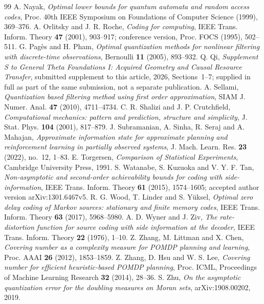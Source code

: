 \begin{thebibliography}{99}
 A. Nayak, \emph{Optimal lower bounds for quantum automata and random access codes}, Proc. 40th IEEE Symposium on Foundations of Computer Science (1999), 369--376.
 A. Orlitsky and J. R. Roche, \emph{Coding for computing}, IEEE Trans. Inform. Theory \textbf{47} (2001), 903--917; conference version, Proc. FOCS (1995), 502--511.
 G. Pag\`es and H. Pham, \emph{Optimal quantization methods for nonlinear filtering with discrete-time observations}, Bernoulli \textbf{11} (2005), 893--932.
 Q. Qi, \emph{Supplement S to General Theta Foundations I: Acquired Geometry and Causal Resource Transfer}, submitted supplement to this article, 2026, Sections~1--7; supplied in full as part of the same submission, not a separate publication.
 A. Sellami, \emph{Quantization based filtering method using first order approximation}, SIAM J. Numer. Anal. \textbf{47} (2010), 4711--4734.
 C. R. Shalizi and J. P. Crutchfield, \emph{Computational mechanics: pattern and prediction, structure and simplicity}, J. Stat. Phys. \textbf{104} (2001), 817--879.
 J. Subramanian, A. Sinha, R. Seraj and A. Mahajan, \emph{Approximate information state for approximate planning and reinforcement learning in partially observed systems}, J. Mach. Learn. Res. \textbf{23} (2022), no.~12, 1--83.
 E. Torgersen, \emph{Comparison of Statistical Experiments}, Cambridge University Press, 1991.
 S. Watanabe, S. Kuzuoka and V. Y. F. Tan, \emph{Non-asymptotic and second-order achievability bounds for coding with side-information}, IEEE Trans. Inform. Theory \textbf{61} (2015), 1574--1605; accepted author version arXiv:1301.6467v5.
 R. G. Wood, T. Linder and S. Y\"uksel, \emph{Optimal zero delay coding of Markov sources: stationary and finite memory codes}, IEEE Trans. Inform. Theory \textbf{63} (2017), 5968--5980.
 A. D. Wyner and J. Ziv, \emph{The rate-distortion function for source coding with side information at the decoder}, IEEE Trans. Inform. Theory \textbf{22} (1976), 1--10.
 Z. Zhang, M. Littman and X. Chen, \emph{Covering number as a complexity measure for POMDP planning and learning}, Proc. AAAI \textbf{26} (2012), 1853--1859.
 Z. Zhang, D. Hsu and W. S. Lee, \emph{Covering number for efficient heuristic-based POMDP planning}, Proc. ICML, Proceedings of Machine Learning Research \textbf{32} (2014), 28--36.
 S. Zhu, \emph{On the asymptotic quantization error for the doubling measures on Moran sets}, arXiv:1908.00202, 2019.

\end{thebibliography}
